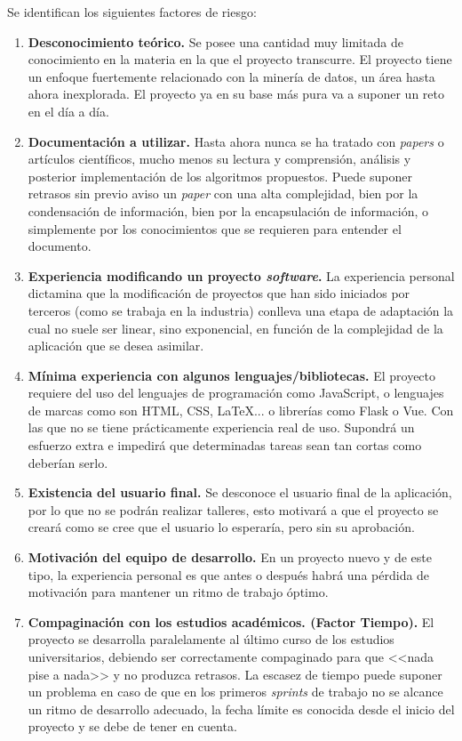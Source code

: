 Se identifican los siguientes factores de riesgo:
\begin{enumerate}
\item \textbf{Desconocimiento teórico.} Se posee una cantidad muy limitada de conocimiento en la materia en la que el proyecto transcurre. El proyecto tiene un enfoque fuertemente relacionado con la minería de datos, un área hasta ahora inexplorada. El proyecto ya en su base más pura va a suponer un reto en el día a día.
\item \textbf{Documentación a utilizar.} Hasta ahora nunca se ha tratado con \textit{papers} o artículos científicos, mucho menos su lectura y comprensión, análisis y posterior implementación de los algoritmos propuestos. Puede suponer retrasos sin previo aviso un \textit{paper} con una alta complejidad, bien por la condensación de información, bien por la encapsulación de información, o simplemente por los conocimientos que se  requieren para entender el documento.
\item \textbf{Experiencia modificando un proyecto \textit{software}.} La experiencia personal dictamina que la modificación de proyectos que han sido iniciados por terceros (como se trabaja en la industria) conlleva una etapa de adaptación la cual no suele ser linear, sino exponencial, en función de la complejidad de la aplicación que se desea asimilar.
\item \textbf{Mínima experiencia con algunos lenguajes/bibliotecas.} El proyecto requiere del uso del lenguajes de programación como JavaScript, o lenguajes de marcas como son HTML, CSS, \LaTeX ... o librerías como Flask o Vue. Con las que no se tiene prácticamente experiencia real de uso. Supondrá un esfuerzo extra e impedirá que determinadas tareas sean tan cortas como deberían serlo.
\item \textbf{Existencia del usuario final.} Se desconoce el usuario final de la aplicación, por lo que no se podrán realizar talleres, esto motivará a que el proyecto se creará como se cree que el usuario lo esperaría, pero sin su aprobación.
\item \textbf{Motivación del equipo de desarrollo.} En un proyecto nuevo y de este tipo, la experiencia personal es que antes o después habrá una pérdida de motivación para mantener un ritmo de trabajo óptimo.
\item \textbf{Compaginación con los estudios académicos. (Factor Tiempo).} El proyecto se desarrolla paralelamente al último curso de los estudios universitarios, debiendo ser correctamente compaginado para que <<nada pise a nada>> y no produzca retrasos. La escasez de tiempo puede suponer un problema en caso de que en los primeros \textit{sprints} de trabajo no se alcance un ritmo de desarrollo adecuado, la fecha límite es conocida desde el inicio del proyecto y se debe de tener en cuenta.

\end{enumerate}

